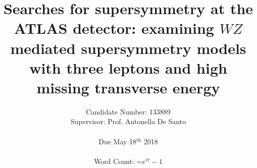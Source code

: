 \title{Searches for supersymmetry at the ATLAS detector: examining $WZ$ mediated supersymmetry models with three leptons and high missing transverse energy}
\author{Candidate Number: 133889 \\ Supervisor: Prof. Antonella De Santo \\ \\ Due May 18$^{\textrm{th}}$ 2018\\ \\ Word Count: $\sim e^{i \pi} - 1$}
\date{}